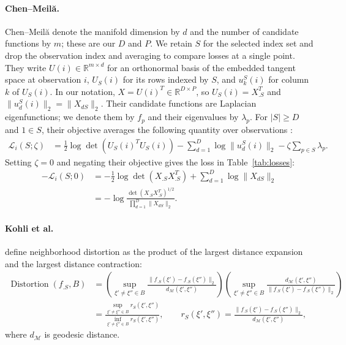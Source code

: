 \paragraph{Chen--Meil\u{a}.}
\label{sec:chen_meila_loss}
Chen--Meil\u{a} denote the manifold dimension by $d$ and the number of candidate functions by $m$; these are our $D$ and $P$.
We retain $S$ for the selected index set and drop the observation index and averaging to compare losses at a single point.
They write $U(i)\in\mathbb R^{m\times d}$ for an orthonormal basis of the embedded tangent space at observation $i$, $U_S(i)$ for its rows indexed by $S$, and $u_k^S(i)$ for column $k$ of $U_S(i)$.
In our notation, $X=U(i)^T\in\mathbb R^{D\times P}$, so $U_S(i)=X_{.S}^T$ and $\|u_d^S(i)\|_2=\|X_{dS}\|_2$.
Their candidate functions are Laplacian eigenfunctions; we denote them by $f_p$ and their eigenvalues by $\lambda_p$.
For $|S|\geq D$ and $1\in S$, their objective averages the following quantity over observations \citep[Eq.~(2)]{NEURIPS2019_6a10bbd4}:
\begin{align}
\mathcal L_i(S;\zeta)
&=\frac12\log\det(U_S(i)^TU_S(i))-\sum_{d=1}^D\log\|u_d^S(i)\|_2-\zeta\sum_{p\in S}\lambda_p.
\end{align}
Setting $\zeta=0$ and negating their objective gives the loss in Table~\ref{tab:losses}:
\begin{align}
-\mathcal L_i(S;0)
&=-\frac12\log\det(X_{.S}X_{.S}^T)+\sum_{d=1}^D\log\|X_{dS}\|_2\\
&=-\log\frac{\det(X_{.S}X_{.S}^T)^{1/2}}{\prod_{d=1}^D\|X_{dS}\|_2}.
\end{align}

\paragraph{Kohli et al.}
\label{proof:distortion_is_condition_number}
\citet[Eqs.~(1)--(3)]{Kohli2021-lr} define neighborhood distortion as the product of the largest distance expansion and the largest distance contraction:
\begin{align}
\operatorname{Distortion}(f_{.S},B)
&=\left(\sup_{\xi'\ne\xi''\in B}\frac{\|f_{.S}(\xi')-f_{.S}(\xi'')\|_2}{d_{\mathcal M}(\xi',\xi'')}\right)
\left(\sup_{\xi'\ne\xi''\in B}\frac{d_{\mathcal M}(\xi',\xi'')}{\|f_{.S}(\xi')-f_{.S}(\xi'')\|_2}\right)\\
&=\frac{\sup_{\xi'\ne\xi''\in B}r_S(\xi',\xi'')}{\inf_{\xi'\ne\xi''\in B}r_S(\xi',\xi'')},
\qquad r_S(\xi',\xi'')=\frac{\|f_{.S}(\xi')-f_{.S}(\xi'')\|_2}{d_{\mathcal M}(\xi',\xi'')},
\end{align}
where $d_{\mathcal M}$ is geodesic distance.

